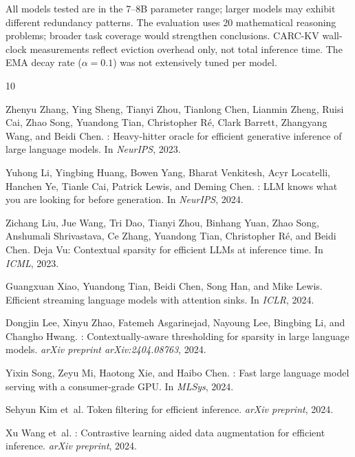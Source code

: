 \documentclass[11pt]{article}
\begin{document}
All models tested are in the 7--8B parameter range; larger models may exhibit different redundancy patterns. The evaluation uses 20 mathematical reasoning problems; broader task coverage would strengthen conclusions. CARC-KV wall-clock measurements reflect eviction overhead only, not total inference time. The EMA decay rate ($\alpha{=}0.1$) was not extensively tuned per model.


\begin{thebibliography}{10}

Zhenyu Zhang, Ying Sheng, Tianyi Zhou, Tianlong Chen, Lianmin Zheng, Ruisi Cai, Zhao Song, Yuandong Tian, Christopher R{\'e}, Clark Barrett, Zhangyang Wang, and Beidi Chen.
: Heavy-hitter oracle for efficient generative inference of large language models.
\newblock In \emph{NeurIPS}, 2023.

Yuhong Li, Yingbing Huang, Bowen Yang, Bharat Venkitesh, Acyr Locatelli, Hanchen Ye, Tianle Cai, Patrick Lewis, and Deming Chen.
: {LLM} knows what you are looking for before generation.
\newblock In \emph{NeurIPS}, 2024.

Zichang Liu, Jue Wang, Tri Dao, Tianyi Zhou, Binhang Yuan, Zhao Song, Anshumali Shrivastava, Ce Zhang, Yuandong Tian, Christopher R{\'e}, and Beidi Chen.
\newblock Deja {V}u: Contextual sparsity for efficient {LLM}s at inference time.
\newblock In \emph{ICML}, 2023.

Guangxuan Xiao, Yuandong Tian, Beidi Chen, Song Han, and Mike Lewis.
\newblock Efficient streaming language models with attention sinks.
\newblock In \emph{ICLR}, 2024.

Dongjin Lee, Xinyu Zhao, Fatemeh Asgarinejad, Nayoung Lee, Bingbing Li, and Changho Hwang.
: Contextually-aware thresholding for sparsity in large language models.
\newblock \emph{arXiv preprint arXiv:2404.08763}, 2024.

Yixin Song, Zeyu Mi, Haotong Xie, and Haibo Chen.
: Fast large language model serving with a consumer-grade {GPU}.
\newblock In \emph{MLSys}, 2024.

Sehyun Kim et~al.
\newblock Token filtering for efficient inference.
\newblock \emph{arXiv preprint}, 2024.

Xu Wang et~al.
: Contrastive learning aided data augmentation for efficient inference.
\newblock \emph{arXiv preprint}, 2024.

\end{thebibliography}
\end{document}
